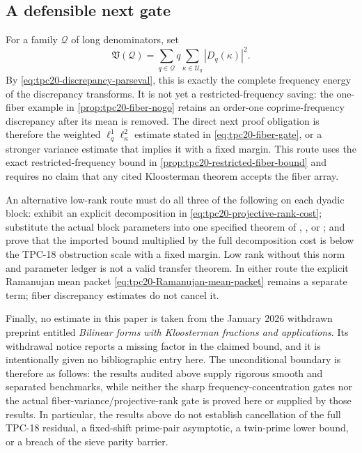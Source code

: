 \subsection{A defensible next gate}

For a family \(\mathcal Q\) of long denominators, set
\begin{equation}
 \mathfrak V(\mathcal Q)
 =\sum_{q\in\mathcal Q}q
   \sum_{\kappa\in\mathcal U_q}|D_q(\kappa)|^2.
 \label{eq:tpc20-total-fiber-variance}
\end{equation}
By \eqref{eq:tpc20-discrepancy-parseval}, this is exactly the complete
frequency energy of the discrepancy transforms.  It is not yet a
restricted-frequency saving: the one-fiber example in
\cref{prop:tpc20-fiber-nogo} retains an order-one coprime-frequency
discrepancy after its mean is removed.  The direct next proof obligation is
therefore the weighted \(\ell^1_q\ell^2_\kappa\) estimate stated in
\eqref{eq:tpc20-fiber-gate}, or a stronger variance estimate that implies
it with a fixed margin.  This route uses the exact restricted-frequency
bound in \cref{prop:tpc20-restricted-fiber-bound} and requires no claim
that any cited Kloosterman theorem accepts the fiber array.

An alternative low-rank route must do all three of the following on each
dyadic block: exhibit an explicit decomposition in
\eqref{eq:tpc20-projective-rank-cost}; substitute the actual block
parameters into one specified theorem of
\citet{DukeFriedlanderIwaniec1997}, \citet{BettinChandee2018}, or
\citet{Wright2026}; and prove that the imported bound multiplied by the
full decomposition cost is below the TPC-18 obstruction scale with a
fixed margin.  Low rank without this norm and parameter ledger is not a
valid transfer theorem.  In either route the explicit Ramanujan mean
packet \eqref{eq:tpc20-Ramanujan-mean-packet} remains a separate term;
fiber discrepancy estimates do not cancel it.

Finally, no estimate in this paper is taken from the January 2026
withdrawn preprint entitled \emph{Bilinear forms with Kloosterman
fractions and applications}.  Its withdrawal notice reports a missing
factor in the claimed bound, and it is intentionally given no
bibliographic entry here.  The unconditional boundary is therefore as
follows: the results audited above supply rigorous smooth and separated
benchmarks, while neither the sharp frequency-concentration gates nor
the actual fiber-variance/projective-rank gate is proved here or supplied
by those results.  In
particular, the results above do not establish cancellation of the full
TPC-18 residual, a fixed-shift prime-pair asymptotic, a twin-prime lower
bound, or a breach of the sieve parity barrier.
